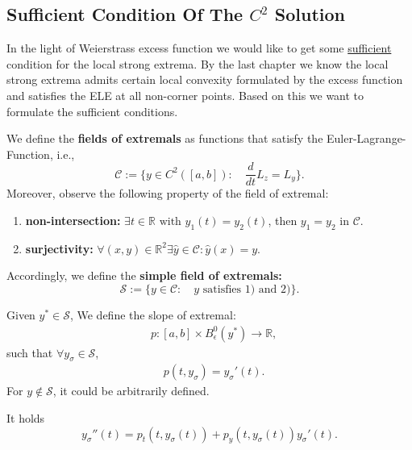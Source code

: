 \subsection{Sufficient Condition Of The \texorpdfstring{$C^2$}{C2} Solution}

In the light of Weierstrass excess function we would like to get some \underline{sufficient} condition for the local strong extrema. By the last chapter we know the local strong extrema admits certain local convexity formulated by the excess function and  satisfies the ELE at all non-corner points. Based on this we want to formulate the sufficient conditions.
\begin{definition}
	We define the \textbf{fields of extremals } as functions that satisfy the Euler-Lagrange-Function, i.e., 
	\begin{equation}
		\mathcal{C}:= \{ y \in C^2([a, b]): \quad \frac{d}{dt} L_z = L_y \}. 
	\end{equation}
	Moreover, observe the following property of the field of extremal:
	\begin{enumerate}
		\item \textbf{non-intersection:} $\exists t \in \mathbb{R} \text{ with } y_1(t) = y_2(t)$, then $y_1 = y_2$ in $\mathcal{C}$. 
		\item \textbf{surjectivity: }$\forall (x, y) \in \mathbb{R}^2 \exists \hat{y} \in \mathcal{C}: \hat{y}(x) = y$. 
	\end{enumerate}
	Accordingly, we define the \textbf{simple field of extremals:}
	\begin{equation}
		\mathcal{S}:= \{ y \in \mathcal{C}: \quad y \text{ satisfies 1) and 2)}\}. 
	\end{equation}
\end{definition}

\begin{definition}
Given $y^* \in \mathcal{S}$, We define the slope of extremal:  
\begin{equation*}
\begin{aligned}
	& p:  [a, b] \times B_\epsilon^0(y^*) \rightarrow \mathbb{R}, 
\end{aligned}
\end{equation*}
such that $\forall y_\sigma \in \mathcal{S}$, 
\begin{align*}
	& p(t, y_\sigma) = y_\sigma'(t).
\end{align*}
For $y \notin \mathcal{S}$, it could be arbitrarily defined. 
\end{definition}
\begin{remark}
It holds
\begin{equation}
	y_\sigma''(t) = p_t(t, y_\sigma(t)) + p_y(t, y_\sigma(t))y_\sigma'(t). 
\end{equation}	
\end{remark}

